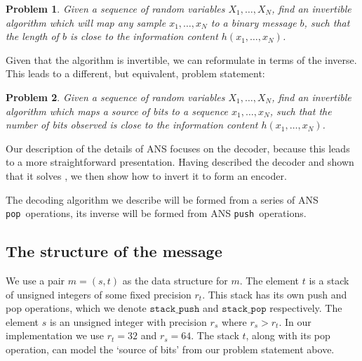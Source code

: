 \documentclass{article}
\newtheorem{problem}{Problem}
\newcommand{\push}{\texttt{push}}
\newcommand{\pop}{\texttt{pop}}
\begin{document}
\begin{problem}\label{prob:default}
  Given a sequence of random variables $X_1, \ldots, X_N$, find an invertible
  algorithm which will map any sample $x_1, \ldots, x_N$ to a binary message
  $b$, such that the length of $b$ is close to the information content $h(x_1,
  \ldots, x_N)$.
\end{problem}

Given that the algorithm is invertible, we can reformulate 
in terms of the inverse. This leads to a different, but equivalent, problem
statement:

\begin{problem}\label{prob:alt}
  Given a sequence of random variables $X_1, \ldots, X_N$, find an invertible
  algorithm which maps a source of bits to a sequence $x_1, \ldots, x_N$, such
  that the number of bits observed is close to the information content $h(x_1,
  \ldots, x_N)$.
\end{problem}

Our description of the details of ANS focuses on the decoder, because this
leads to a more straightforward presentation. Having described the decoder and
shown that it solves , we then show how to invert it to form an
encoder.

The decoding algorithm we describe will be formed from a series of ANS \pop\
operations, its inverse will be formed from ANS \push\ operations.

\subsection*{The structure of the message}
We use a pair $m = (s, t)$ as the data structure for $m$. The element $t$ is a
stack of unsigned integers of some fixed precision $r_t$. This stack has its
own push and pop operations, which we denote $\texttt{stack\_push}$ and
$\texttt{stack\_pop}$ respectively. The element $s$ is an unsigned integer with
precision $r_s$ where $r_s > r_t$. In our implementation we use $r_t = 32$ and
$r_s = 64$. The stack $t$, along with its pop operation, can model the `source
of bits' from our problem statement above.
\end{document}
